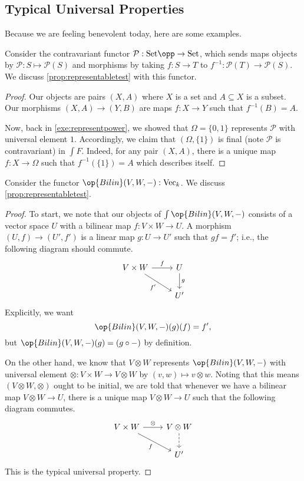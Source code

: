 \documentclass[../notes.tex]{subfiles}
\begin{document}
\subsection{Typical Universal Properties}
Because we are feeling benevolent today, here are some examples.
\begin{exe}
	Consider the contravariant functor $\mathcal P:\mathrm{Set}\opp\to\mathrm{Set}$, which sends maps objects by $\mathcal P:S\mapsto\mathcal P(S)$ and morphisms by taking $f:S\to T$ to $f^{-1}:\mathcal P(T)\to\mathcal P(S)$. We discuss \autoref{prop:representabletest} with this functor.
\end{exe}
\begin{proof}
	Our objects are pairs $(X,A)$ where $X$ is a set and $A\subseteq X$ is a subset. Our morphisms $(X,A)\to(Y,B)$ are maps $f:X\to Y$ such that $f^{-1}(B)=A$.

	Now, back in \autoref{exe:representpower}, we showed that $\Omega=\{0,1\}$ represents $\mathcal P$ with universal element $1$. Accordingly, we claim that $(\Omega,\{1\})$ is final (note $\mathcal P$ is contravariant) in $\int F$. Indeed, for any pair $(X,A)$, there is a unique map $f:X\to\Omega$ such that $f^{-1}(\{1\})=A$ which describes itself.
\end{proof}
\begin{exe}
	Consider the functor $\op{Bilin}(V,W,-):\mathrm{Vec}_k$. We discuss \autoref{prop:representabletest}.
\end{exe}
\begin{proof}
	To start, we note that our objects of $\int\op{Bilin}(V,W,-)$ consists of a vector space $U$ with a bilinear map $f:V\times W\to U$. A morphism $(U,f)\to(U',f')$ is a linear map $g:U\to U'$ such that $gf=f'$; i.e., the following diagram should commute.
	\[\begin{tikzcd}
		{V\times W} & U \\
		& {U'}
		\arrow["f", from=1-1, to=1-2]
		\arrow["{f'}"', from=1-1, to=2-2]
		\arrow["g", from=1-2, to=2-2]
	\end{tikzcd}\]
	Explicitly, we want
	\[\op{Bilin}(V,W,-)(g)(f)=f',\]
	but $\op{Bilin}(V,W,-)(g)=(g\circ-)$ by definition.

	On the other hand, we know that $V\otimes W$ represents $\op{Bilin}(V,W,-)$ with universal element $\otimes:V\times W\to V\otimes W$ by $(v,w)\mapsto v\otimes w$. Noting that this means $(V\otimes W,\otimes)$ ought to be initial, we are told that whenever we have a bilinear map $V\otimes W\to U$, there is a unique map $V\otimes W\to U$ such that the following diagram commutes.
	\[\begin{tikzcd}
		{V\times W} & {V\otimes W} \\
		& {U'}
		\arrow["f"', from=1-1, to=2-2]
		\arrow[dashed, from=1-2, to=2-2]
		\arrow["\otimes", from=1-1, to=1-2]
	\end{tikzcd}\]
	This is the typical universal property.
\end{proof}
\end{document}
